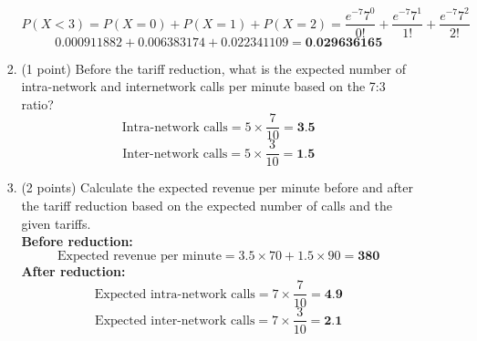 \documentclass[a3paper,12pt]{article} %
\begin{document}
\begin{enumerate}
\begin{enumerate}
\begin{enumerate}
            \[
                P(X < 3) = P(X = 0) + P(X = 1) + P(X = 2) = \frac{e^{-7} 7^0}{0!} + \frac{e^{-7} 7^1}{1!} + \frac{e^{-7} 7^2}{2!}
            \]
            \[
                0.000911882 + 0.006383174 + 0.022341109 = \textbf{0.029636165}
            \]
            \item (1 point) Before the tariff reduction, what is the expected number of intra-network and internetwork
            calls per minute based on the 7:3 ratio?
            \[
                \text{Intra-network calls} = 5 \times \frac{7}{10} = \textbf{3.5}
            \]
            \[
                \text{Inter-network calls} = 5 \times \frac{3}{10} = \textbf{1.5}
            \]
            \item (2 points) Calculate the expected revenue per minute before and after the tariff reduction based on the expected number of calls and the given tariffs.
            \\ \textbf{Before reduction:}
            \[
                \text{Expected revenue per minute} = 3.5 \times 70 + 1.5 \times 90 = \textbf{380}
            \]
            \textbf{After reduction:}
            \[
                \text{Expected intra-network calls} = 7 \times \frac{7}{10} = \textbf{4.9}
            \]
            \[
                \text{Expected inter-network calls} = 7 \times \frac{3}{10} = \textbf{2.1}
            \]


\end{enumerate}
\end{enumerate}
\end{enumerate}
\end{document}
